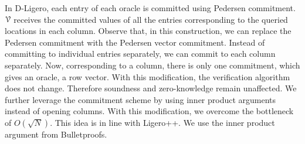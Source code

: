 In D-Ligero, each entry of each oracle is committed using Pedersen commitment. $\mathcal{V}$ receives the committed values of all the entries corresponding to the queried locations in each column.
Observe that, in this construction, we can replace the Pedersen commitment with the Pedersen vector commitment. Instead of committing to individual entries separately, we can commit to each column separately. Now, corresponding to a column, there is only one commitment, which gives an oracle, a row vector. With this modification, the verification algorithm does not change. Therefore soundness and zero-knowledge remain unaffected.
We further leverage the commitment scheme by using inner product arguments instead of opening columns. With this modification, we overcome the bottleneck of $O(\sqrt{N})$. This idea is in line with Ligero++. We use the inner product argument from Bulletproofs.

